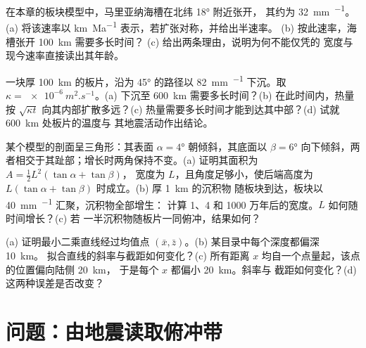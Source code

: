\begin{exercise}[$\star\star$]\label{exo:b1:active-margins:9}
在本章的板块模型中，马里亚纳海槽在北纬 \ang{18} 附近张开，
其约为 \qty{32}{mm.^{-1}}。(a) 将该速率以
\unit{km.Ma^{-1}} 表示，若扩张对称，并给出半速率。
(b) 按此速率，海槽张开 \qty{100}{km} 需要多长时间？
(c) 给出两条理由，说明为何不能仅凭的
宽度与现今速率直接读出其年龄。
\end{exercise}

\begin{exercise}[$\star\star\star$]\label{exo:b1:active-margins:10}
一块厚 \qty{100}{km} 的板片，沿为
\ang{45} 的路径以 \qty{82}{mm.^{-1}} 下沉。取 $\kappa = \qty{e-6}{m^2.s^{-1}}$。(a) 下沉至
\qty{600}{km} 需要多长时间？(b) 在此时间内，热量按
$\sqrt{\kappa t}$ 向其内部扩散多远？(c) 热量需要多长时间才能到达其中部？(d)
试就 \qty{600}{km} 处板片的温度与
其地震活动作出结论。
\end{exercise}

\begin{exercise}[$\star\star\star$]\label{exo:b1:active-margins:11}
某个模型的剖面呈三角形：其表面
$\alpha = \ang{4}$ 朝倾斜，其底面以 $\beta = \ang{6}$
向下倾斜，两者相交于其趾部；增长时两角保持不变。(a)
证明其面积为 $A = \frac12 L^2(\tan\alpha + \tan\beta)$，
宽度为 $L$，且角度足够小，使后端高度为
$L(\tan\alpha + \tan\beta)$ 时成立。(b) 厚 \qty{1}{km} 的沉积物
随板块到达，板块以 \qty{40}{mm.^{-1}} 汇聚，沉积物全部增生：
计算 1、4 和 1000 万年后的宽度。$L$ 如何随时间增长？(c) 若
一半沉积物随板片一同俯冲，结果如何？
\end{exercise}

\begin{exercise}[$\star\star\star$]\label{exo:b1:active-margins:12}
(a) 证明最小二乘直线经过均值点
$(\bar x, \bar z)$。(b) 某目录中每个深度都偏深 \qty{10}{km}。
拟合直线的斜率与截距如何变化？(c) 所有距离
$x$ 均自一个点量起，该点的位置偏向陆侧 \qty{20}{km}，
于是每个 $x$ 都偏小 \qty{20}{km}。斜率与
截距如何变化？(d) 这两种误差是否改变？
\end{exercise}

\section{问题：由地震读取俯冲带}

